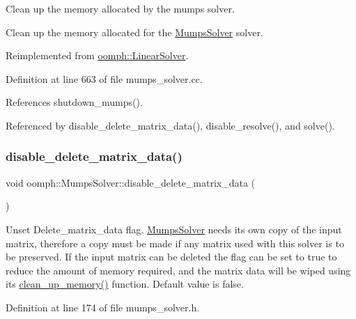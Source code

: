 Clean up the memory allocated by the mumps solver. 

Clean up the memory allocated for the \hyperlink{classoomph_1_1MumpsSolver}{Mumps\+Solver} solver. 

Reimplemented from \hyperlink{classoomph_1_1LinearSolver_a9d66f3262e80ca06a365f98216afd85f}{oomph\+::\+Linear\+Solver}.



Definition at line 663 of file mumps\+\_\+solver.\+cc.



References shutdown\+\_\+mumps().



Referenced by disable\+\_\+delete\+\_\+matrix\+\_\+data(), disable\+\_\+resolve(), and solve().

\mbox{\label{classoomph_1_1MumpsSolver_a52b3fbf9407cb8284f1c80600b11869f}} 
\subsubsection{\texorpdfstring{disable\+\_\+delete\+\_\+matrix\+\_\+data()}{disable\_delete\_matrix\_data()}}
{\footnotesize\ttfamily void oomph\+::\+Mumps\+Solver\+::disable\+\_\+delete\+\_\+matrix\+\_\+data (\begin{DoxyParamCaption}{ }\end{DoxyParamCaption})\hspace{0.3cm}{\ttfamily [inline]}}



Unset Delete\+\_\+matrix\+\_\+data flag. \hyperlink{classoomph_1_1MumpsSolver}{Mumps\+Solver} needs its own copy of the input matrix, therefore a copy must be made if any matrix used with this solver is to be preserved. If the input matrix can be deleted the flag can be set to true to reduce the amount of memory required, and the matrix data will be wiped using its \hyperlink{classoomph_1_1MumpsSolver_adc1541e4a9cbbe9c641f988380618713}{clean\+\_\+up\+\_\+memory()} function. Default value is false. 



Definition at line 174 of file mumps\+\_\+solver.\+h.



